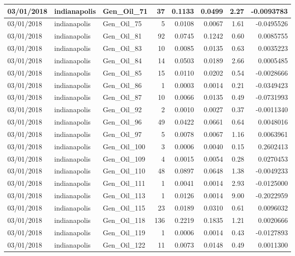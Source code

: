 \documentclass[
  letterpaper,
  DIV=11,
  numbers=noendperiod]{scrartcl}
\begin{document}
\begin{tabular}{l|l|l|r|r|r|r|r}
\hline
03/01/2018 & indianapolis & Gen\_Oil\_71 & 37 & 0.1133 & 0.0499 & 2.27 & -0.0093783\\
\hline
03/01/2018 & indianapolis & Gen\_Oil\_75 & 5 & 0.0108 & 0.0067 & 1.61 & -0.0495526\\
\hline
03/01/2018 & indianapolis & Gen\_Oil\_81 & 92 & 0.0745 & 0.1242 & 0.60 & 0.0085755\\
\hline
03/01/2018 & indianapolis & Gen\_Oil\_83 & 10 & 0.0085 & 0.0135 & 0.63 & 0.0035223\\
\hline
03/01/2018 & indianapolis & Gen\_Oil\_84 & 14 & 0.0503 & 0.0189 & 2.66 & 0.0005485\\
\hline
03/01/2018 & indianapolis & Gen\_Oil\_85 & 15 & 0.0110 & 0.0202 & 0.54 & -0.0028666\\
\hline
03/01/2018 & indianapolis & Gen\_Oil\_86 & 1 & 0.0003 & 0.0014 & 0.21 & -0.0349423\\
\hline
03/01/2018 & indianapolis & Gen\_Oil\_87 & 10 & 0.0066 & 0.0135 & 0.49 & -0.0731993\\
\hline
03/01/2018 & indianapolis & Gen\_Oil\_92 & 2 & 0.0010 & 0.0027 & 0.37 & -0.0011340\\
\hline
03/01/2018 & indianapolis & Gen\_Oil\_96 & 49 & 0.0422 & 0.0661 & 0.64 & 0.0048016\\
\hline
03/01/2018 & indianapolis & Gen\_Oil\_97 & 5 & 0.0078 & 0.0067 & 1.16 & 0.0063961\\
\hline
03/01/2018 & indianapolis & Gen\_Oil\_100 & 3 & 0.0006 & 0.0040 & 0.15 & 0.2602413\\
\hline
03/01/2018 & indianapolis & Gen\_Oil\_109 & 4 & 0.0015 & 0.0054 & 0.28 & 0.0270453\\
\hline
03/01/2018 & indianapolis & Gen\_Oil\_110 & 48 & 0.0897 & 0.0648 & 1.38 & -0.0049233\\
\hline
03/01/2018 & indianapolis & Gen\_Oil\_111 & 1 & 0.0041 & 0.0014 & 2.93 & -0.0125000\\
\hline
03/01/2018 & indianapolis & Gen\_Oil\_113 & 1 & 0.0126 & 0.0014 & 9.00 & -0.2022959\\
\hline
03/01/2018 & indianapolis & Gen\_Oil\_115 & 23 & 0.0189 & 0.0310 & 0.61 & 0.0096032\\
\hline
03/01/2018 & indianapolis & Gen\_Oil\_118 & 136 & 0.2219 & 0.1835 & 1.21 & 0.0020666\\
\hline
03/01/2018 & indianapolis & Gen\_Oil\_119 & 1 & 0.0006 & 0.0014 & 0.43 & -0.0127893\\
\hline
03/01/2018 & indianapolis & Gen\_Oil\_122 & 11 & 0.0073 & 0.0148 & 0.49 & 0.0011300\\

\end{tabular}
\end{document}
